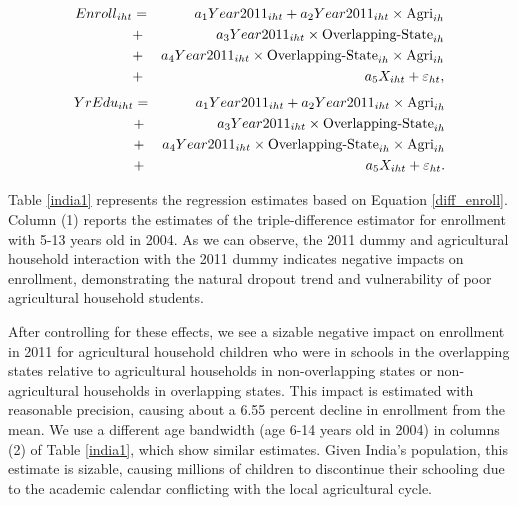 \documentclass[12pt,letterpaper]{article}\usepackage[margin=1in]{geometry}
\newcommand{\0}{\ensuremath{\mbox{\boldmath $0$}}}
\begin{document}
\begin{eqnarray}
	{Enroll}_{iht} & = &
    a_1 {Year2011}_{iht}
    + a_2 {Year2011}_{iht}\times\textnormal{Agri}_{ih} \nonumber\\
    &+& a_3  {Year2011}_{iht}\times\textnormal{Overlapping-State}_{ih} \nonumber\\
    &+& a_4 {Year2011}_{iht}\times \textnormal{Overlapping-State}_{ih}\times\textnormal{Agri}_{ih}   \nonumber \\
    &+& a_5{X}_{iht} +\varepsilon_{ht}, \label{diff_enroll}
\end{eqnarray}
\begin{eqnarray}
	{YrEdu}_{iht} & = &
    a_1 {Year2011}_{iht}
    + a_2 {Year2011}_{iht}\times\textnormal{Agri}_{ih} \nonumber\\
    &+& a_3  {Year2011}_{iht}\times\textnormal{Overlapping-State}_{ih} \nonumber\\
    &+& a_4 {Year2011}_{iht}\times \textnormal{Overlapping-State}_{ih}\times\textnormal{Agri}_{ih}   \nonumber \\
    &+& a_5{X}_{iht} + \varepsilon_{ht}. \label{diff_edu}
\end{eqnarray}





Table \ref{india1} represents the regression estimates based on Equation \ref{diff_enroll}. Column (1) reports the estimates of the triple-difference estimator for enrollment with 5-13 years old in 2004. As we can observe, the 2011 dummy and agricultural household interaction with the 2011 dummy indicates negative impacts on enrollment, demonstrating the natural dropout trend and vulnerability of poor agricultural household students.

After controlling for these effects, we see a sizable negative impact on enrollment in 2011 for agricultural household children who were in schools in the overlapping states relative to agricultural households in non-overlapping states or non-agricultural households in overlapping states. This impact is estimated with reasonable precision, causing about a 6.55 percent decline in enrollment from the mean. We use a different age bandwidth (age 6-14 years old in 2004) in columns (2) of Table \ref{india1}, which show similar estimates. Given India's population, this estimate is sizable, causing millions of children to discontinue their schooling due to the academic calendar conflicting with the local agricultural cycle.  
\end{document}
